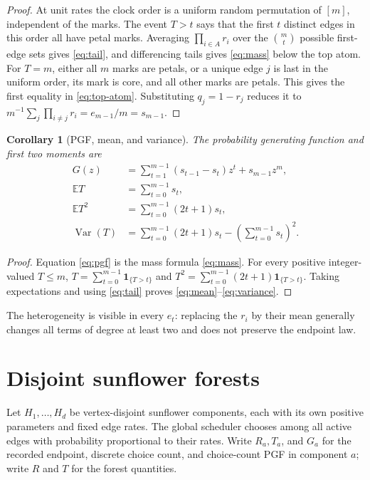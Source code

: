 \documentclass[10pt,a4paper]{amsart}
\newcommand{\EE}{\mathbb E}
\newcommand{\one}{\mathbf 1}
\DeclareMathOperator{\Var}{Var}
\newtheorem{corollary}[theorem]{Corollary}
\begin{document}
\begin{proof}
At unit rates the clock order is a uniform random permutation of $[m]$,
independent of the marks.  The event $T>t$ says that the first $t$ distinct
edges in this order all have petal marks.  Averaging
$\prod_{i\in A}r_i$ over the $\binom mt$ possible first-edge sets gives
\eqref{eq:tail}, and differencing tails gives \eqref{eq:mass} below the top
atom.  For $T=m$, either all $m$ marks are petals, or a unique edge $j$ is
last in the uniform order, its mark is core, and all other marks are petals.
This gives the first equality in \eqref{eq:top-atom}.  Substituting
$q_j=1-r_j$ reduces it to
$m^{-1}\sum_j\prod_{i\ne j}r_i=e_{m-1}/m=s_{m-1}$.
\end{proof}

\begin{corollary}[PGF, mean, and variance]\label{cor:moments}
The probability generating function and first two moments are
\begin{align}
 G(z)&=\sum_{t=1}^{m-1}(s_{t-1}-s_t)z^t+s_{m-1}z^m,
 \label{eq:pgf}\\
 \EE T&=\sum_{t=0}^{m-1}s_t,\label{eq:mean}\\
 \EE T^2&=\sum_{t=0}^{m-1}(2t+1)s_t,\label{eq:second}\\
 \Var(T)&=\sum_{t=0}^{m-1}(2t+1)s_t-
 \left(\sum_{t=0}^{m-1}s_t\right)^2.\label{eq:variance}
\end{align}
\end{corollary}

\begin{proof}
Equation \eqref{eq:pgf} is the mass formula
\eqref{eq:mass}.  For every positive integer-valued $T\leq m$,
$T=\sum_{t=0}^{m-1}\one_{\{T>t\}}$ and
$T^2=\sum_{t=0}^{m-1}(2t+1)\one_{\{T>t\}}$.  Taking expectations and using
\eqref{eq:tail} proves \eqref{eq:mean}--\eqref{eq:variance}.
\end{proof}

The heterogeneity is visible in every $e_t$: replacing the $r_i$ by their
mean generally changes all terms of degree at least two and does not preserve
the endpoint law.

\section{Disjoint sunflower forests}

Let $H_1,\ldots,H_d$ be vertex-disjoint sunflower components, each with its
own positive parameters and fixed edge rates.  The global scheduler chooses
among all active edges with probability proportional to their rates.  Write
$R_a,T_a$, and $G_a$ for the recorded endpoint, discrete choice count, and
choice-count PGF in component $a$; write $R$ and $T$ for the forest
quantities.
\end{document}
